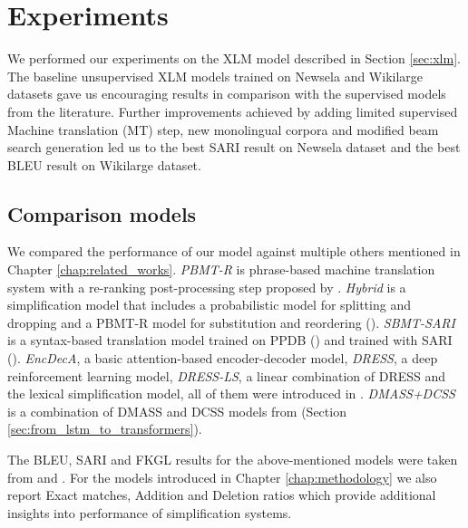 \chapter{Experiments}
\label{chap:experiments}

We performed our experiments on the XLM model described in Section \ref{sec:xlm}. The baseline unsupervised XLM models trained on Newsela and Wikilarge datasets gave us encouraging results in comparison with the supervised models from the literature. Further improvements achieved by adding limited supervised Machine translation (MT) step, new monolingual corpora and modified beam search generation led us to the best SARI result on Newsela dataset and the best BLEU result on Wikilarge dataset. 


\section{Comparison models}

We compared the performance of our model against multiple others mentioned in Chapter \ref{chap:related_works}. \emph{PBMT-R} is phrase-based machine translation system with a re-ranking post-processing step proposed by \cite{wubben-etal-2012-sentence}. \emph{Hybrid} is a simplification model that includes a probabilistic model for splitting and dropping and a PBMT-R model for substitution and reordering (\cite{narayan-gardent-2014-hybrid}). \emph{SBMT-SARI} is a syntax-based translation model trained on PPDB (\cite{ganitkevitch-etal-2013-ppdb}) and trained with SARI (\cite{zhang-lapata-2017-sentence}). \emph{EncDecA}, a basic attention-based encoder-decoder model, \emph{DRESS}, a deep reinforcement learning model, \emph{DRESS-LS}, a linear combination of DRESS and the lexical simplification model, all of them were introduced in \cite{zhang-lapata-2017-sentence}. \emph{DMASS+DCSS} is a combination of DMASS and DCSS models from \cite{zhao2018integrating} (Section \ref{sec:from_lstm_to_transformers}).

The BLEU, SARI and FKGL results for the above-mentioned models were taken from \cite{zhang-lapata-2017-sentence} and \cite{zhao2018integrating}. For the models introduced in Chapter \ref{chap:methodology} we also report Exact matches, Addition and Deletion ratios which provide additional insights into performance of simplification systems.

